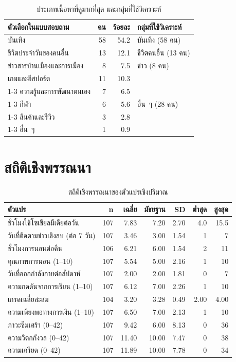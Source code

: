 \begin{table}[H]
\centering
\caption{ประเภทเนื้อหาที่ดูมากที่สุด และกลุ่มที่ใช้วิเคราะห์}
\label{tab:content}
\begin{tabular}{|l|r|r|l|}
\hline
\textbf{ตัวเลือกในแบบสอบถาม} & \textbf{คน} & \textbf{ร้อยละ} & \textbf{กลุ่มที่ใช้วิเคราะห์} \\
\hline
บันเทิง & 58 & 54.2 & บันเทิง (58 คน) \\
\hline
ชีวิตประจำวันของคนอื่น & 13 & 12.1 & ชีวิตคนอื่น (13 คน) \\
\hline
ข่าวสารบ้านเมืองและการเมือง & 8 & 7.5 & ข่าว (8 คน) \\
\hline
เกมและอีสปอร์ต & 11 & 10.3 & \multirow{5}{*}{อื่น~ๆ (28 คน)} \\
\cline{1-3}
ความรู้และการพัฒนาตนเอง & 7 & 6.5 & \\
\cline{1-3}
กีฬา & 6 & 5.6 & \\
\cline{1-3}
สินค้าและรีวิว & 3 & 2.8 & \\
\cline{1-3}
อื่น~ๆ & 1 & 0.9 & \\
\hline
\end{tabular}
\end{table}

\section{สถิติเชิงพรรณนา}

\begin{table}[H]
\centering
\caption{สถิติเชิงพรรณนาของตัวแปรเชิงปริมาณ}
\label{tab:descriptive}
\begin{tabular}{|l|r|r|r|r|r|r|}
\hline
\textbf{ตัวแปร} & \textbf{n} & \textbf{เฉลี่ย} & \textbf{มัธยฐาน} & \textbf{SD} & \textbf{ต่ำสุด} & \textbf{สูงสุด} \\
\hline
ชั่วโมงใช้โซเชียลมีเดียต่อวัน & 107 & 7.83 & 7.20 & 2.70 & 4.0 & 15.5 \\
วันที่ติดตามข่าวเชิงลบ (ต่อ 7 วัน) & 107 & 3.46 & 3.00 & 1.54 & 1 & 7 \\
ชั่วโมงการนอนต่อคืน & 106 & 6.21 & 6.00 & 1.54 & 2 & 11 \\
คุณภาพการนอน (1--10) & 107 & 5.54 & 5.00 & 2.16 & 1 & 10 \\
วันที่ออกกำลังกายต่อสัปดาห์ & 107 & 2.00 & 2.00 & 1.81 & 0 & 7 \\
ความกดดันจากการเรียน (1--10) & 107 & 6.12 & 7.00 & 2.26 & 1 & 10 \\
เกรดเฉลี่ยสะสม & 104 & 3.20 & 3.28 & 0.49 & 2.00 & 4.00 \\
ความเพียงพอทางการเงิน (1--10) & 107 & 6.50 & 7.00 & 2.13 & 1 & 10 \\
\hline
ภาวะซึมเศร้า (0--42) & 107 & 9.42 & 6.00 & 8.13 & 0 & 36 \\
ความวิตกกังวล (0--42) & 107 & 11.40 & 10.00 & 7.47 & 0 & 38 \\
ความเครียด (0--42) & 107 & 11.89 & 10.00 & 7.78 & 0 & 34 \\
\hline
\end{tabular}
\end{table}


